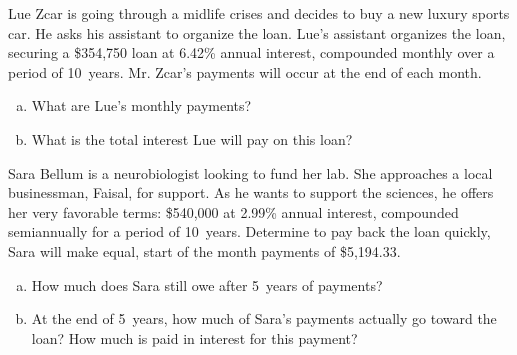 \documentclass[11pt,letterpaper]{article}
\begin{document}

 Lue Zcar is going through a midlife crises and decides to buy a new luxury sports car. He asks his assistant to organize the loan. Lue's assistant organizes the loan, securing a \$354,750 loan at 6.42\% annual interest, compounded monthly over a period of 10~years. Mr. Zcar's payments will occur at the end of each month. 
	\begin{enumerate}[(a)]
	\item What are Lue's monthly payments?
	\item What is the total interest Lue will pay on this loan?
	\end{enumerate}



\newpage



 Sara Bellum is a neurobiologist looking to fund her lab. She approaches a local businessman, Faisal, for support. As he wants to support the sciences, he offers her very favorable terms: \$540,000 at 2.99\% annual interest, compounded semiannually for a period of 10~years. Determine to pay back the loan quickly, Sara will make equal, start of the month payments of \$5,194.33.
	\begin{enumerate}[(a)]
	\item How much does Sara still owe after 5~years of payments?
	\item At the end of 5~years, how much of Sara's payments actually go toward the loan? How much is paid in interest for this payment?
	\end{enumerate}
\end{document}
